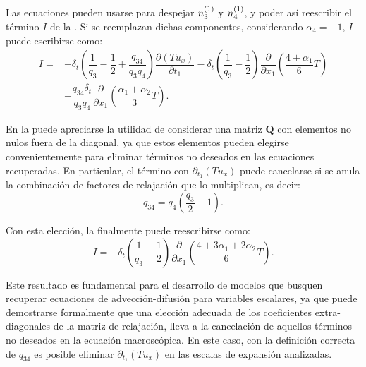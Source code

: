 Las ecuaciones  pueden usarse para despejar $n_{3}^{(1)}$ y $n_{4}^{(1)}$, y poder as\'i reescribir el t\'ermino $I$ de la . Si se reemplazan dichas componentes, considerando $\alpha_4 = -1$, $I$ puede escribirse como:
\begin{equation}
\begin{aligned}
	I =& -\delta_t \left( \dfrac{1}{q_3} - \dfrac{1}{2}  + \dfrac{q_{34}}{q_3 q_4}  \right) \dfrac{\partial (Tu_x)}{\partial t_1} - \delta_t \left( \dfrac{1}{q_3} - \dfrac{1}{2} \right) \dfrac{\partial}{\partial x_1} \left(\dfrac{4+\alpha_1}{6} T \right) \\
	&+ \dfrac{q_{34}\delta_t}{q_3q_4}\dfrac{\partial}{\partial x_1} \left(\dfrac{\alpha_1+\alpha_2}{3} T \right).
	\label{eq:I_0}
\end{aligned}
\end{equation}


En la  puede apreciarse la utilidad de considerar una matriz $\bm{Q}$ con elementos no nulos fuera de la diagonal, ya que estos elementos pueden elegirse convenientemente para eliminar t\'erminos no deseados en las ecuaciones recuperadas. En particular, el t\'ermino con $\partial_{t_1}(Tu_x)$ puede cancelarse si se anula la combinaci\'on de factores de relajaci\'on que lo multiplican, es decir:
\begin{equation}
	q_{34} = q_4 \left( \dfrac{q_3}{2} - 1 \right).
\end{equation}

Con esta elecci\'on, la  finalmente puede reescribirse como:
\begin{equation}
	I = -\delta_t \left( \dfrac{1}{q_3} - \dfrac{1}{2} \right) \dfrac{\partial}{\partial x_1} \left(\dfrac{4+3\alpha_1 + 2\alpha_2}{6} T \right).
	\label{eq:I_1}
\end{equation}

Este resultado es fundamental para el desarrollo de modelos que busquen recuperar ecuaciones de advecci\'on-difusi\'on para variables escalares, ya que puede demostrarse formalmente que una elecci\'on adecuada de los coeficientes extra-diagonales de la matriz de relajaci\'on, lleva a la cancelaci\'on de aquellos t\'erminos no deseados en la ecuaci\'on macrosc\'opica. En este caso, con la definici\'on correcta de $q_{34}$ es posible eliminar $\partial_{t_1}(Tu_x)$ en las escalas de expansi\'on analizadas.

